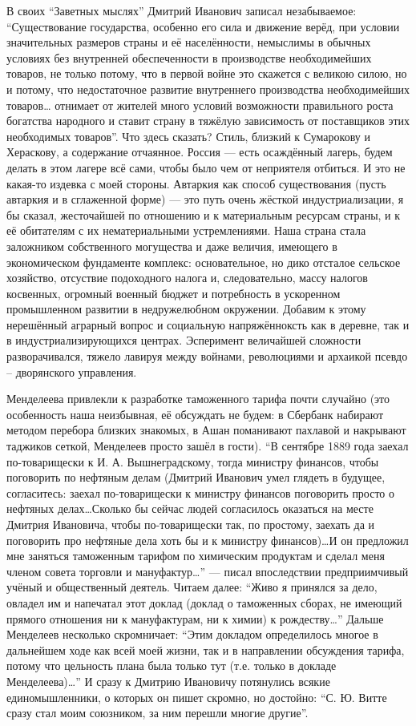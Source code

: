 \begin{enumerate}
В своих \enquote{Заветных мыслях} Дмитрий Иванович записал незабываемое:
\enquote{Существование государства, особенно его сила и движение верёд, при условии
значительных размеров страны и её населённости, немыслимы в обычных условиях
без внутренней обеспеченности в производстве необходимейших товаров, не только
потому, что в первой войне это скажется с великою силою, но и потому, что
недостаточное развитие внутреннего производства необходимейших товаров\ldots
отнимает от жителей много условий возможности правильного роста богатства
народного и ставит страну в тяжёлую зависимость от поставщиков этих необходимых
товаров}. Что здесь сказать? Стиль, близкий к Сумарокову и Хераскову, а
содержание отчаянное. Россия --- есть осаждённый лагерь, будем делать в этом
лагере всё сами, чтобы было чем от неприятеля отбиться. И это не какая-то
издевка с моей стороны. Автаркия как способ существования (пусть автаркия и в
сглаженной форме) --- это путь очень жёсткой индустриализации, я бы сказал,
жесточайшей по отношению и к материальным ресурсам страны, и к её обитателям с
их нематериальными устремлениями. Наша страна стала заложником собственного
могущества и даже  величия, имеющего в экономическом фундаменте комплекс:
основательное, но дико отсталое сельское хозяйство, отсуствие подоходного
налога и, следовательно, массу налогов косвенных, огромный военный бюджет и
потребность в ускоренном промышленном развитии в недружелюбном окружении.
Добавим к этому нерешённый аграрный вопрос и социальную напряжённоксть как в
деревне, так и в индустриализирующихся центрах. Эсперимент величайшей сложности
разворачивался, тяжело лавируя между войнами, революциями и архаикой
псевдо -- дворянского управления.

Менделеева привлекли к разработке таможенного тарифа почти случайно (это
особенность наша неизбывная, её обсуждать не будем: в Сбербанк набирают методом
перебора близких знакомых, в Ашан поманивают пахлавой и накрывают таджиков
сеткой, Менделеев просто зашёл в гости). \enquote{В сентябре 1889 года заехал
по-товарищески к И. А. Вышнеградскому, тогда министру финансов, чтобы поговорить
по нефтяным делам (Дмитрий Иванович умел глядеть в будущее, согласитесь:
заехал по-товарищески к министру финансов поговорить просто о нефтяных
делах\ldots Сколько бы сейчас людей согласилось оказаться на месте Дмитрия
Ивановича, чтобы по-товарищески так, по простому, заехать да и поговорить про
нефтяные дела хоть бы и к министру финансов)\ldots И он предложил мне заняться
таможенным тарифом по химическим продуктам и сделал меня членом совета торговли
и мануфактур\ldots} --- писал впоследствии предприимчивый учёный и общественный
деятель. Читаем далее: \enquote{Живо я принялся за дело, овладел им и напечатал этот
доклад (доклад о таможенных сборах, не имеющий прямого отношения ни к
мануфактурам, ни к химии) к рождеству\ldots} Дальше Менделеев несколько
скромничает: \enquote{Этим докладом определилось многое в дальнейшем ходе как всей моей
жизни, так и в направлении обсуждения тарифа, потому что цельность плана была
только тут (т.е. только в докладе Менделеева)\ldots} И сразу к Дмитрию
Ивановичу потянулись всякие единомышленники, о которых он пишет скромно, но
достойно: \enquote{С. Ю. Витте сразу стал моим союзником, за ним перешли многие
другие}.


\end{enumerate}
